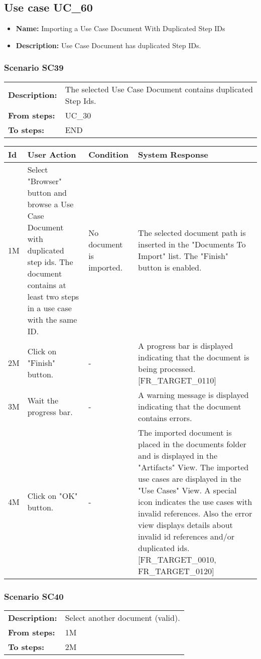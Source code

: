 \documentclass[a4paper,11pt]{article}
\newcommand{\bl}{\\ \hline}
\begin{document}
\subsection*{Use case UC_60}
\begin{itemize}
\item {\bf Name: }Importing a Use Case Document With Duplicated Step IDs
\item {\bf Description: }Use Case Document has duplicated Step IDs.
\end{itemize}
\subsubsection*{Scenario SC39}
\begin{tabular}{p{1in}p{4in}}
{\bf Description:} & The selected Use Case Document contains duplicated Step
					Ids. \\
{\bf From steps:} & UC_30#2M \\
{\bf To steps:} & END \\
\end{tabular}
 
\begin{tabular}{|p{0.8in}|p{1.6in}|p{1.6in}|p{1.6in}|}
\hline
Id & User Action & Condition & System Response  \bl 
1M & Select "Browser" button and browse a Use Case Document with
						duplicated step ids. The document contains at least two steps in a
						use case with the same ID.  & No document is imported. & The selected document path is inserted in the "Documents
						To Import" list. The "Finish" button is enabled. \bl 
2M & Click on "Finish" button. & - & A progress bar is displayed indicating that the document
						is being processed. [FR_TARGET_0110] \bl 
3M & Wait the progress bar. & - & A warning message is displayed indicating that the
						document contains errors. \bl 
4M & Click on "OK" button. & - & The imported document is placed in the documents folder
						and is displayed in the "Artifacts" View. The imported use cases
						are displayed in the "Use Cases" View. A special icon indicates
						the use cases with invalid references. Also the error view
						displays details about invalid id references and/or duplicated
						ids. [FR_TARGET_0010, FR_TARGET_0120] \bl 
\end{tabular}
\subsubsection*{Scenario SC40}
\begin{tabular}{p{1in}p{4in}}
{\bf Description:} & Select another document (valid). \\
{\bf From steps:} & 1M \\
{\bf To steps:} & 2M \\
\end{tabular}
 
\end{document}
